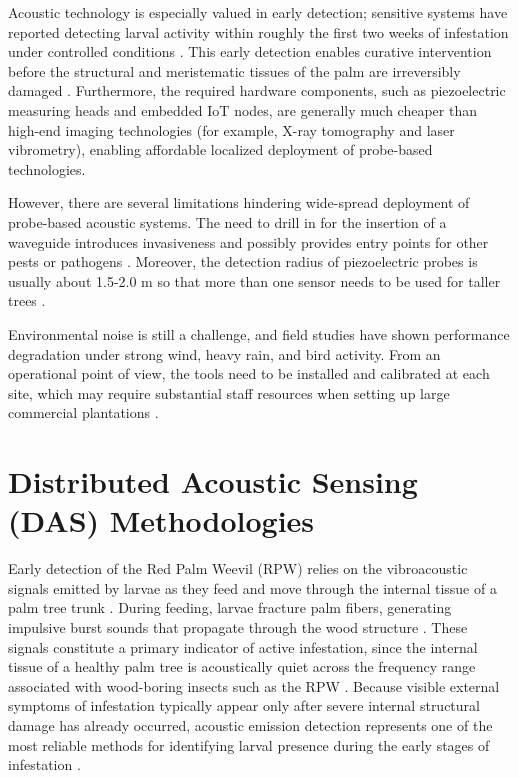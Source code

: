 \documentclass[12pt,a4paper,oneside]{memoir}
\begin{document}
Acoustic technology is especially valued in early detection; sensitive systems have reported detecting larval activity within roughly the first two weeks of infestation under controlled conditions \cite{ashry2020,saranya2025}. This early detection enables curative intervention before the structural and meristematic tissues of the palm are irreversibly damaged \cite{saleem2022,saranya2025}. Furthermore, the required hardware components, such as piezoelectric measuring heads and embedded IoT nodes, are generally much cheaper than high-end imaging technologies (for example, X-ray tomography and laser vibrometry), enabling affordable localized deployment of probe-based technologies.

However, there are several limitations hindering wide-spread deployment of probe-based acoustic systems. The need to drill in for the insertion of a waveguide introduces invasiveness and possibly provides entry points for other pests or pathogens \cite{karar2022}. Moreover, the detection radius of piezoelectric probes is usually about 1.5-2.0 m so that more than one sensor needs to be used for taller trees \cite{pinhas2008,karar2022}.

Environmental noise is still a challenge, and field studies have shown performance degradation under strong wind, heavy rain, and bird activity. From an operational point of view, the tools need to be installed and calibrated at each site, which may require substantial staff resources when setting up large commercial plantations \cite{karar2022,ashry2022cnn}.

\section{Distributed Acoustic Sensing (DAS) Methodologies} \label{sec:GRP-II}

Early detection of the Red Palm Weevil (RPW) relies on the vibroacoustic signals emitted by larvae as they feed and move through the internal tissue of a palm tree trunk \cite{ashry2022cnn,wang2021}. During feeding, larvae fracture palm fibers, generating impulsive burst sounds that propagate through the wood structure \cite{ashry2022cnn,wang2021}. These signals constitute a primary indicator of active infestation, since the internal tissue of a healthy palm tree is acoustically quiet across the frequency range associated with wood-boring insects such as the RPW \cite{pinhas2008,ashry2022cnn}. Because visible external symptoms of infestation typically appear only after severe internal structural damage has already occurred, acoustic emission detection represents one of the most reliable methods for identifying larval presence during the early stages of infestation \cite{pinhas2008,wang2021}.
\end{document}
